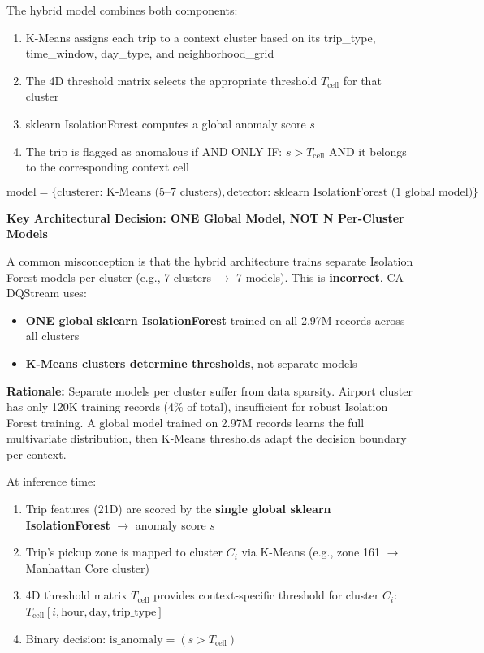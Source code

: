 The hybrid model combines both components:

\begin{enumerate}
    \item K-Means assigns each trip to a context cluster based on its trip\_type, time\_window, day\_type, and neighborhood\_grid
    \item The 4D threshold matrix selects the appropriate threshold $T_{\text{cell}}$ for that cluster
    \item sklearn IsolationForest computes a global anomaly score $s$
    \item The trip is flagged as anomalous if AND ONLY IF: $s > T_{\text{cell}}$ AND it belongs to the corresponding context cell
\end{enumerate}
\begin{equation}
\text{model} = \{\text{clusterer: K-Means (5--7 clusters)}, \text{detector: sklearn IsolationForest (1 global model)}\}
\end{equation}

\textbf{Key Architectural Decision: ONE Global Model, NOT N Per-Cluster Models}

A common misconception is that the hybrid architecture trains separate Isolation Forest models per cluster (e.g., 7 clusters $\to$ 7 models). This is \textbf{incorrect}. CA-DQStream uses:

\begin{itemize}
    \item \textbf{ONE global sklearn IsolationForest} trained on all 2.97M records across all clusters
    \item \textbf{K-Means clusters determine thresholds}, not separate models
\end{itemize}

\textbf{Rationale:} Separate models per cluster suffer from data sparsity. Airport cluster has only 120K training records (4\% of total), insufficient for robust Isolation Forest training. A global model trained on 2.97M records learns the full multivariate distribution, then K-Means thresholds adapt the decision boundary per context.

At inference time:
\begin{enumerate}
    \item Trip features (21D) are scored by the \textbf{single global sklearn IsolationForest} $\to$ anomaly score $s$
    \item Trip's pickup zone is mapped to cluster $C_i$ via K-Means (e.g., zone 161 $\to$ Manhattan Core cluster)
    \item 4D threshold matrix $T_{\text{cell}}$ provides context-specific threshold for cluster $C_i$: $T_{\text{cell}}[i, \text{hour}, \text{day}, \text{trip\_type}]$
    \item Binary decision: $\text{is\_anomaly} = (s > T_{\text{cell}})$
\end{enumerate}


